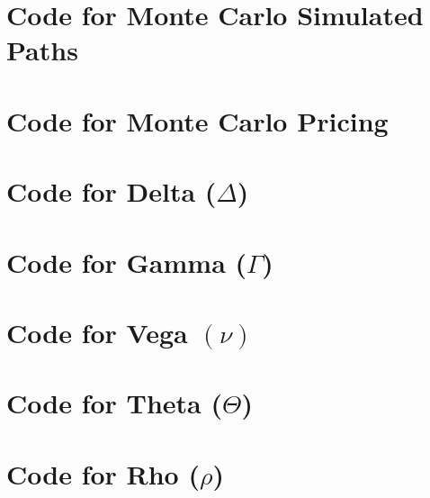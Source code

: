\begin{appendices}
\section{Code for Monte Carlo Simulated Paths}
\label{section:A2}

\newpage
\section{Code for Monte Carlo Pricing}

\newpage
\section{Code for Delta ($\Delta$)}

\newpage
\section{Code for Gamma ($\Gamma$)}

\newpage
\section{Code for Vega $(\nu)$}

\newpage
\section{Code for Theta ($\Theta$)}

\newpage
\section{Code for Rho ($\rho$)}

\end{appendices}
